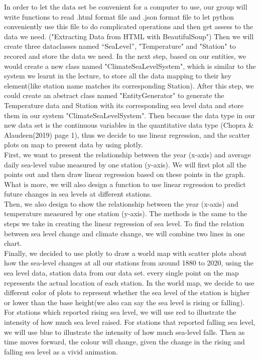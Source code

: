 \documentclass[fontsize=11pt]{article}
\begin{document}
    In order to let the data set be convenient for a computer to use, our group will write functions to read .html format file and .json format file to let python conveniently use this file to do complicated operations and then get assess to the data we need. ("Extracting Data from HTML with BeautifulSoup") Then we will create three dataclasses named “SeaLevel”, "Temperature" and "Station" to recored and store the data we need. In the next step, based on our entities, we would create a new class named "ClimateSeaLevelSystem", which is similar to the system we learnt in the lecture, to store all the data mapping to their key element(like station name matches its corresponding Station). After this step, we could create an abstract class named "EntityGenerator" to generate the Temperature data and Station with its corresponding sea level data and store them in our system "ClimateSeaLevelSystem". Then because the data type in our new data set is the continuous variables in the quantitative data type (Chopra \& Alaudeen(2019) page 1), thus we decide to use linear regression, and the scatter plots on map to present data by using plotly.\\
    First, we want to present the relationship between the year (x-axis) and average daily sea-level value measured by one station (y-axis). We will first plot all the points out and then draw linear regression based on these points in the graph. What is more, we will also design a function to use linear regression to predict future changes in sea levels at different stations. \\
    Then, we also design to show the relationship between the year (x-axis) and temperature measured by one station (y-axis). The methods is the same to the steps we take in creating the linear regression of sea level. To find the relation between sea level change and climate change, we will combine two lines in one chart. \\
    Finally, we decided to use plotly to draw a world map with scatter plots about how the sea-level changes at all our stations from around 1880 to 2020, using the sea level data, station data from our data set. every single point on the map represents the actual location of each station. In the world map, we decide to use different color of plots to represent whether the sea level of the station is higher or lower than the base height(we also can say the sea level is rising or falling). For stations which reported rising sea level, we will use red to illustrate the intensity of how much sea level raised. For stations that reported falling sea level, we will use blue to illustrate the intensity of how much sea-level falls. Then as time moves forward, the colour will change, given the change in the rising and falling sea level as a vivid animation.\\
\end{document}

